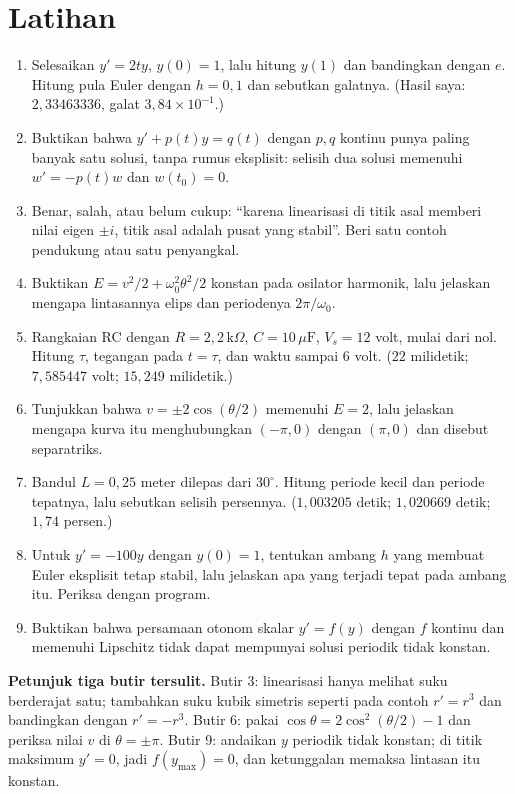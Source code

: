 \section{Latihan}
\begin{latihan}
\begin{enumerate}
\item Selesaikan $y'=2ty$, $y(0)=1$, lalu hitung $y(1)$ dan bandingkan dengan
  $e$. Hitung pula Euler dengan $h=0{,}1$ dan sebutkan galatnya. (Hasil saya:
  $2{,}33463336$, galat $3{,}84\times10^{-1}$.)
\item Buktikan bahwa $y'+p(t)y=q(t)$ dengan $p,q$ kontinu punya paling banyak
  satu solusi, tanpa rumus eksplisit: selisih dua solusi memenuhi
  $w'=-p(t)w$ dan $w(t_{0})=0$.
\item Benar, salah, atau belum cukup: ``karena linearisasi di titik asal memberi
  nilai eigen $\pm i$, titik asal adalah pusat yang stabil''. Beri satu contoh
  pendukung atau satu penyangkal.
\item Buktikan $E=v^{2}/2+\omega_{0}^{2}\theta^{2}/2$ konstan pada osilator
  harmonik, lalu jelaskan mengapa lintasannya elips dan periodenya
  $2\pi/\omega_{0}$.
\item Rangkaian RC dengan $R=2{,}2\,\mathrm{k}\Omega$, $C=10\,\mu\mathrm{F}$,
  $V_{s}=12$ volt, mulai dari nol. Hitung $\tau$, tegangan pada $t=\tau$, dan
  waktu sampai $6$ volt. ($22$ milidetik; $7{,}585447$ volt; $15{,}249$ milidetik.)
\item Tunjukkan bahwa $v=\pm2\cos(\theta/2)$ memenuhi $E=2$, lalu jelaskan
  mengapa kurva itu menghubungkan $(-\pi,0)$ dengan $(\pi,0)$ dan disebut
  separatriks.
\item Bandul $L=0{,}25$ meter dilepas dari $30^{\circ}$. Hitung periode kecil dan
  periode tepatnya, lalu sebutkan selisih persennya. ($1{,}003205$ detik;
  $1{,}020669$ detik; $1{,}74$ persen.)
\item Untuk $y'=-100y$ dengan $y(0)=1$, tentukan ambang $h$ yang membuat Euler
  eksplisit tetap stabil, lalu jelaskan apa yang terjadi tepat pada ambang itu.
  Periksa dengan program.
\item Buktikan bahwa persamaan otonom skalar $y'=f(y)$ dengan $f$ kontinu dan
  memenuhi Lipschitz tidak dapat mempunyai solusi periodik tidak konstan.
\end{enumerate}

\textbf{Petunjuk tiga butir tersulit.} Butir 3: linearisasi hanya melihat suku
berderajat satu; tambahkan suku kubik simetris seperti pada contoh $r'=r^{3}$
dan bandingkan dengan $r'=-r^{3}$. Butir 6: pakai
$\cos\theta=2\cos^{2}(\theta/2)-1$ dan periksa nilai $v$ di $\theta=\pm\pi$.
Butir 9: andaikan $y$ periodik tidak konstan; di titik maksimum $y'=0$, jadi
$f(y_{\max})=0$, dan ketunggalan memaksa lintasan itu konstan.
\end{latihan}

